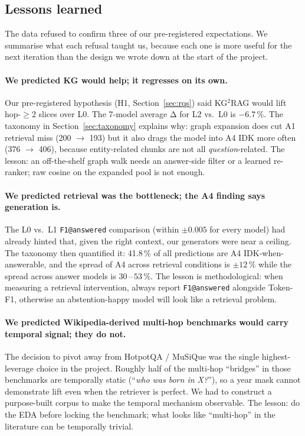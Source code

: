 \documentclass[11pt]{article}
\begin{document}
\subsection{Lessons learned}
\label{sec:lessons}

The data refused to confirm three of our pre-registered expectations.
We summarise what each refusal taught us, because each one is more
useful for the next iteration than the design we wrote down at the
start of the project.

\paragraph{We predicted KG would help; it regresses on its own.}
Our pre-registered hypothesis (H1, Section~\ref{sec:rqs}) said
KG$^{2}$RAG would lift hop-$\geq$2 slices over L0. The 7-model average
Δ for L2 vs.\ L0 is $-6.7\,\%$. The taxonomy in
Section~\ref{sec:taxonomy} explains why: graph expansion does cut A1
retrieval miss (200 $\to$ 193) but it also drags the model into A4 IDK
more often (376 $\to$ 406), because entity-related chunks are not all
\emph{question}-related. The lesson: an off-the-shelf graph walk
needs an answer-side filter or a learned re-ranker; raw cosine on the
expanded pool is not enough.

\paragraph{We predicted retrieval was the bottleneck; the A4 finding says generation is.}
The L0 vs.\ L1 \texttt{F1@answered} comparison (within $\pm 0.005$ for
every model) had already hinted that, given the right context, our
generators were near a ceiling. The taxonomy then quantified it:
41.8\,\% of all predictions are A4 IDK-when-answerable, and the
spread of A4 across retrieval conditions is $\pm 12\,\%$ while the
spread across answer models is $30$\,--\,$53\,\%$. The lesson is
methodological: when measuring a retrieval intervention, always
report \texttt{F1@answered} alongside Token-F1, otherwise an
abstention-happy model will look like a retrieval problem.

\paragraph{We predicted Wikipedia-derived multi-hop benchmarks would carry temporal signal; they do not.}
The decision to pivot away from HotpotQA / MuSiQue was the
single highest-leverage choice in the project. Roughly half of the
multi-hop ``bridges'' in those benchmarks are temporally static
(``\textit{who was born in X?}''), so a year mask cannot demonstrate
lift even when the retriever is perfect. We had to construct a
purpose-built corpus to make the temporal mechanism observable. The
lesson: do the EDA before locking the benchmark; what looks like
``multi-hop'' in the literature can be temporally trivial.
\end{document}
